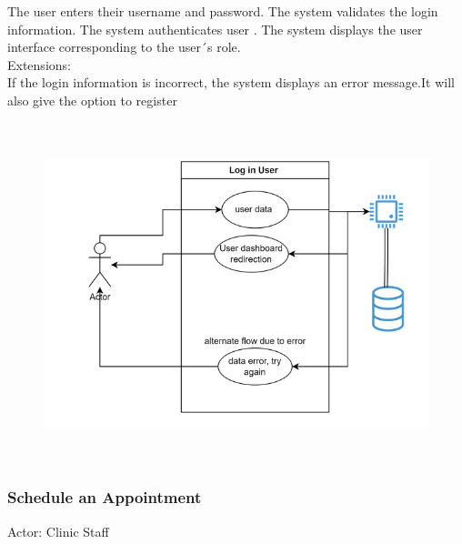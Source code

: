 \documentclass{scrreprt}
\begin{document}
	The  user enters their username and password.
	The system validates the login information.
	The system authenticates user .
	The system displays the user interface corresponding to the user´s role.\\
	Extensions:\\
	
	If the login information is incorrect, the system displays an error message.It will also give the option to register 
	\begin{figure}[h]
		\begin{center}
			\includegraphics[width=350pt,height=280pt]{usuario2.png}
		\end{center}
		\label{fig:Use case 2}
	\end{figure}
	\pagebreak
	\subsubsection{Schedule an Appointment}
	Actor: Clinic Staff\\
	
\end{document}
